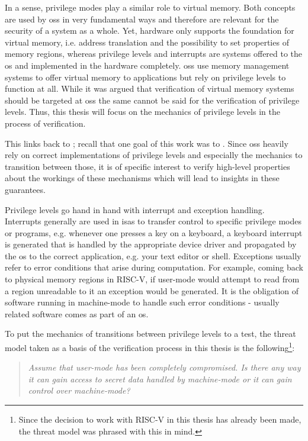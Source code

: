 In a sense, privilege modes play a similar role to virtual memory.
Both concepts are used by \glspl{os} in very fundamental ways and therefore are relevant for the security of a system as a whole.
Yet, hardware only supports the foundation for virtual memory, i.e. address translation and the possibility to set properties of memory regions, whereas privilege levels and interrupts are systems offered to the \gls{os} and implemented in the hardware completely.
\glspl{os} use memory management systems to offer virtual memory to applications but rely on privilege levels to function at all.
While it was argued that verification of virtual memory systems should be targeted at \glspl{os} the same cannot be said for the verification of privilege levels.
Thus, this thesis will focus on the mechanics of privilege levels in the process of verification.

This links back to \cite{Reid17}; recall that one goal of this work was to .
Since \glspl{os} heavily rely on correct implementations of privilege levels and especially the mechanics to transition between those, it is of specific interest to verify high-level properties about the workings of these mechanisms which will lead to insights in these guarantees.

Privilege levels go hand in hand with interrupt and exception handling.
Interrupts generally are used in \glspl{isa} to transfer control to specific privilege modes or programs, e.g. whenever one presses a key on a keyboard, a keyboard interrupt is generated that is handled by the appropriate device driver and propagated by the \gls{os} to the correct application, e.g. your text editor or shell.
Exceptions usually refer to error conditions that arise during computation.
For example, coming back to physical memory regions in RISC-V, if user-mode would attempt to read from a region unreadable to it an exception would be generated.
It is the obligation of software running in machine-mode to handle such error conditions - usually related software comes as part of an \gls{os}.

To put the mechanics of transitions between privilege levels to a test, the threat model taken as a basis of the verification process in this thesis is the following\footnote{%
    Since the decision to work with RISC-V in this thesis has already been made, the threat model was phrased with this in mind.
}:
\begin{quote}
    \itshape
    Assume that user-mode has been completely compromised.
    Is there any way it can gain access to secret data handled by machine-mode or it can gain control over machine-mode?
\end{quote}

